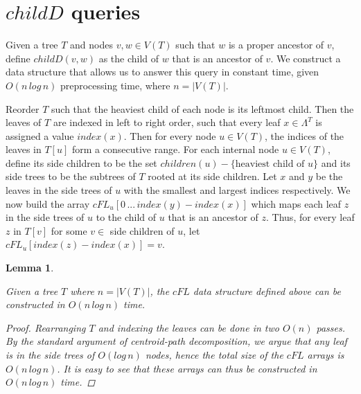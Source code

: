 \documentclass[12pt,a4paper]{article}
\newcommand{\leafset}{\Lambda}
\newtheorem{cfddatastructure}[incompatibility]{Lemma}
\begin{document}
    \section{$childD$ queries}
    \label{sec:cfd}

    Given a tree $T$ and nodes $v, w \in V(T)$ such that $w$ is a proper ancestor of $v$, define $childD(v, w)$ as the child of $w$ that is an ancestor of $v$. We construct a data structure that allows us to answer this query in constant time, given $O(n\,log\,n)$ preprocessing time, where $n = |V(T)|$.

    Reorder $T$ such that the heaviest child of each node is its leftmost child. Then the leaves of $T$ are indexed in left to right order, such that every leaf $x \in \leafset^T$ is assigned a value $index(x)$. Then for every node $u \in V(T)$, the indices of the leaves in $T[u]$ form a consecutive range. For each internal node $u \in V(T)$, define its side children to be the set $children(u) - \{\text{heaviest child of }u\}$ and its side trees to be the subtrees of $T$ rooted at its side children. Let $x$ and $y$ be the leaves in the side trees of $u$ with the smallest and largest indices respectively. We now build the array $cFL_u[0\, ...\, index(y) - index(x)]$ which maps each leaf $z$ in the side trees of $u$ to the child of $u$ that is an ancestor of $z$. Thus, for every leaf $z$ in $T[v]$ for some $v \in$ side children of $u$, let $cFL_u[index(z) - index(x)] = v$.
    \newline

    \begin{cfddatastructure}
        \label{lem:cfddatastructure}

        Given a tree $T$ where $n = |V(T)|$, the $cFL$ data structure defined above can be constructed in $O(n\,log\,n)$ time.

        \begin{proof}
            Rearranging $T$ and indexing the leaves can be done in two $O(n)$ passes. By the standard argument of centroid-path decomposition, we argue that any leaf is in the side trees of $O(log\,n)$ nodes, hence the total size of the $cFL$ arrays is $O(n\,log\,n)$. It is easy to see that these arrays can thus be constructed in $O(n\,log\,n)$ time.
        \end{proof}
    \end{cfddatastructure}
\end{document}
